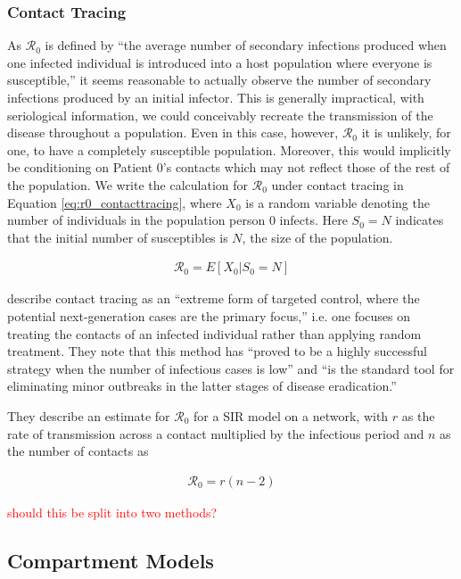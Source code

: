 \documentclass[12pt]{article}
\newcommand{\com}[1]{\textcolor{red}{ #1}}
\newcommand{\rr}{\ensuremath{\mathcal{R}_0}}
\begin{document}
\subsubsection{Contact Tracing}
\label{sec:contact_tracing}
As $\rr$ is defined by \cite{anderson1992} ``the average number of secondary infections produced when one infected individual is introduced into a host population where everyone is susceptible,'' it seems reasonable to actually observe the number of secondary infections produced by an initial infector.  This is generally impractical, with seriological information, we could conceivably recreate the transmission of the disease throughout a population.  Even in this case, however, $\rr$ it is unlikely, for one, to have a completely susceptible population.  Moreover, this would implicitly be conditioning on Patient 0's contacts which may not reflect those of the rest of the population.  We write the calculation for $\rr$ under contact tracing in Equation \ref{eq:r0_contacttracing}, where $X_0$ is a random variable denoting the number of individuals in the population person 0 infects.  Here $S_0=N$ indicates that the initial number of susceptibles is $N$, the size of the population.

\begin{align}\label{eq:r0_contacttracing}
\rr = E[ X_0 | S_0 = N]
\end{align}

\cite{eames2003} describe contact tracing as an ``extreme form of targeted control, where the potential next-generation cases are the primary focus,'' i.e. one focuses on treating the contacts of an infected individual rather than applying random treatment.  They note that this method has ``proved to be a highly successful strategy when the number of infectious cases is low'' and ``is the standard tool for eliminating minor outbreaks in the latter stages of disease eradication.''

They describe an estimate for $\rr$ for a SIR model on a network, with $r$ as the rate of transmission across a contact multiplied by the infectious period and $n$ as the number of contacts as

\begin{align*}
\rr = r(n-2)
\end{align*}


\com{should this be split into two methods?}


\subsection{Compartment Models}
\label{sec:cms}
\end{document}

